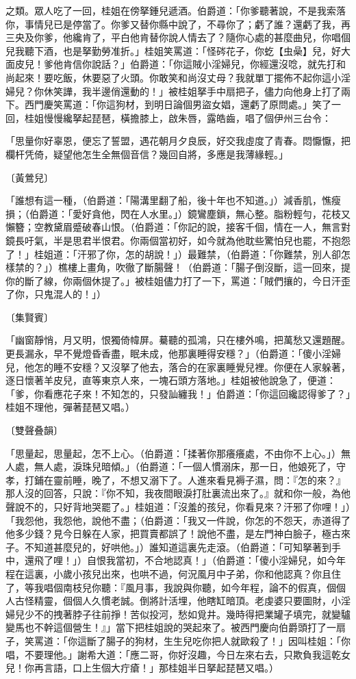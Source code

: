 之類。眾人吃了一回，桂姐在傍拏鍾兒遞酒。伯爵道：「你爹聽著說，不是我索落你，事情兒已是停當了。你爹又替你縣中說了，不尋你了；虧了誰？還虧了我，再三央及你爹，他纔肯了，平白他肯替你說人情去了？隨你心處的甚麼曲兒，你唱個兒我聽下酒，也是拏勤勞准折。」桂姐笑罵道：「怪硶花子，你虼【虫喿】兒，好大面皮兒！爹他肯信你說話？」伯爵道：「你這賊小淫婦兒，你經還沒唸，就先打和尚起來！要吃飯，休要惡了火頭。你敢笑和尚沒丈母？我就單丁擺佈不起你這小淫婦兒？你休笑譁，我半邊俏還動的！」被桂姐拏手中扇把子，儘力向他身上打了兩下。西門慶笑罵道：「你這狗材，到明日論個男盜女娼，還虧了原問處。」笑了一回，桂姐慢慢纔拏起琵琶，橫擔膝上，啟朱唇，露皓齒，唱了個伊州三台令：

「思量你好辜恩，便忘了誓盟，遇花朝月夕良辰，好交我虛度了青春。悶懨懨，把欄杆凭倚，疑望他怎生全無個音信？幾回自將，多應是我薄緣輕。」

〔黃鶯兒〕

「誰想有這一種，（伯爵道：「陽溝里翻了船，後十年也不知道。」）減香肌，憔瘦損；（伯爵道：「愛好貪他，閃在人水里。」）鏡鸞塵鎖，無心整。脂粉輕勻，花枝又懶簪；空教黛眉蹙破春山恨。（伯爵道：「你記的說，接客千個，情在一人，無言對鏡長吁氣，半是思君半恨君。你兩個當初好，如今就為他耽些驚怕兒也罷，不抱怨了！」桂姐道：「汗邪了你，怎的胡說！」）最難禁，（伯爵道：「你難禁，別人卻怎樣禁的？」）樵樓上畫角，吹徹了斷腸聲！（伯爵道：「腸子倒沒斷，這一回來，提你的斷了線，你兩個休提了。」被桂姐儘力打了一下，罵道：「賊們攘的，今日汗歪了你，只鬼混人的！」）

〔集賢賓〕

「幽窗靜悄，月又明，恨獨倚幃屏。驀聽的孤鴻，只在樓外鳴，把萬愁又還題醒。更長漏永，早不覺燈昏香盡，眠未成，他那裏睡得安穩？」（伯爵道：「傻小淫婦兒，他怎的睡不安穩？又沒拏了他去，落合的在家裏睡覺兒裡。你便在人家躲著，逐日懷著羊皮兒，直等東京人來，一塊石頭方落地。」桂姐被他說急了，便道：「爹，你看應花子來！不知怎的，只發訕纏我！」伯爵道：「你這回纔認得爹了？」桂姐不理他，彈著琵琶又唱。）

〔雙聲叠韻〕

「思量起，思量起，怎不上心。（伯爵道：「揉著你那癢癢處，不由你不上心。」）無人處，無人處，淚珠兒暗傾。」（伯爵道：「一個人慣溺床，那一日，他娘死了，守孝，打鋪在靈前睡，晚了，不想又溺下了。人進來看見褥子濕，問：『怎的來？』那人沒的回答，只說：『你不知，我夜間眼淚打肚裏流出來了。』就和你一般，為他聲說不的，只好背地哭罷了。」桂姐道：「沒羞的孩兒，你看見來？汗邪了你哩！」）「我怨他，我怨他，說他不盡；（伯爵道：「我又一件說，你怎的不怨天，赤道得了他多少錢？見今日躲在人家，把買賣都誤了！說他不盡，是左門神白臉子，極古來子。不知道甚麼兒的，好哄他。」）誰知道這裏先走滾。（伯爵道：「可知拏著到手中，還飛了哩！」）自恨我當初，不合地認真！」（伯爵道：「傻小淫婦兒，如今年程在這裏，小歲小孩兒出來，也哄不過，何況風月中子弟，你和他認真？你且住了，等我唱個南枝兒你聽：『風月事，我說與你聽，如今年程，論不的假真，個個人古怪精靈，個個人久慣老誠。倒將計活埋，他瞎缸暗頂。老虔婆只要圖財，小淫婦兒少不的拽著脖子往前掙！苦似投河，愁如覓井。幾時得把業罐子填完，就變驢變馬也不幹這個營生！』」當下把桂姐說的哭起來了。被西門慶向伯爵頭打了一扇子，笑罵道：「你這斷了腸子的狗材，生生兒吃你把人就歐殺了！」因叫桂姐：「你唱，不要理他。」謝希大道：「應二哥，你好沒趣，今日左來右去，只欺負我這乾女兒！你再言語，口上生個大疔瘡！」那桂姐半日拏起琵琶又唱。）

